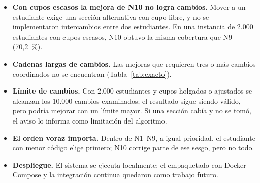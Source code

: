 \begin{itemize}
\item \textbf{Con cupos escasos la mejora de N10 no logra cambios.} Mover a un estudiante exige una sección alternativa con cupo libre, y no se implementaron intercambios entre dos estudiantes. En una instancia de 2.000 estudiantes con cupos escasos, N10 obtuvo la misma cobertura que N9 (70,2~\%).
\item \textbf{Cadenas largas de cambios.} Las mejoras que requieren tres o más cambios coordinados no se encuentran (Tabla~\ref{tab:exacto}).
\item \textbf{Límite de cambios.} Con 2.000 estudiantes y cupos holgados o ajustados se alcanzan los 10.000 cambios examinados; el resultado sigue siendo válido, pero podría mejorar con un límite mayor. Si una sección cabía y no se tomó, el aviso lo informa como limitación del algoritmo.
\item \textbf{El orden voraz importa.} Dentro de N1--N9, a igual prioridad, el estudiante con menor código elige primero; N10 corrige parte de ese sesgo, pero no todo.
\item \textbf{Despliegue.} El sistema se ejecuta localmente; el empaquetado con Docker Compose y la integración continua quedaron como trabajo futuro.
\end{itemize}
